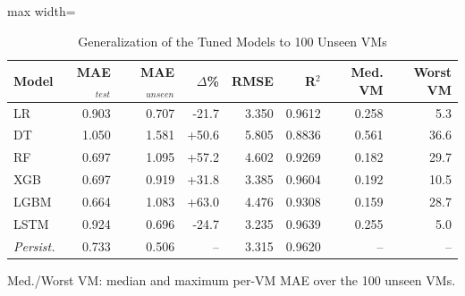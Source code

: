 \begin{table}[!htb]
\centering
\caption{Generalization of the Tuned Models to 100 Unseen VMs}
\label{tab:generalization}
\footnotesize
\setlength{\tabcolsep}{4pt}
\begin{adjustbox}{max width=\columnwidth}
\begin{tabular}{lrrrrrrr}
\toprule
Model & MAE$_{test}$ & MAE$_{unseen}$ & $\Delta$\% & RMSE & R$^2$ & Med. VM & Worst VM \\
\midrule
LR & 0.903 & 0.707 & -21.7 & 3.350 & 0.9612 & 0.258 & 5.3 \\
DT & 1.050 & 1.581 & +50.6 & 5.805 & 0.8836 & 0.561 & 36.6 \\
RF & 0.697 & 1.095 & +57.2 & 4.602 & 0.9269 & 0.182 & 29.7 \\
XGB & 0.697 & 0.919 & +31.8 & 3.385 & 0.9604 & 0.192 & 10.5 \\
LGBM & 0.664 & 1.083 & +63.0 & 4.476 & 0.9308 & 0.159 & 28.7 \\
LSTM & 0.924 & 0.696 & -24.7 & 3.235 & 0.9639 & 0.255 & 5.0 \\
\textit{Persist.} & 0.733 & 0.506 & -- & 3.315 & 0.9620 & -- & -- \\
\bottomrule
\end{tabular}
\end{adjustbox}
\par\vspace{3pt}
{\scriptsize Med./Worst VM: median and maximum per-VM MAE over the 100 unseen VMs.\par}
\end{table}
